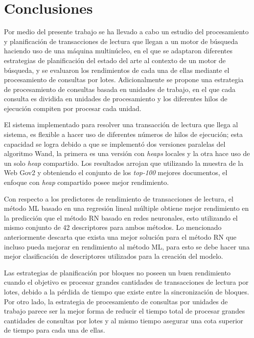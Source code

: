 \chapter{Conclusiones}
\label{cap:conclu}
Por medio del presente trabajo se ha llevado a cabo un estudio del procesamiento y planificación de transacciones de lectura que llegan a un motor de búsqueda haciendo uso de una máquina multinúcleo, en el que se adaptaron diferentes estrategias de planificación del estado del arte al contexto de un motor de búsqueda, y se evaluaron los rendimientos de cada una de ellas mediante el procesamiento de consultas por lotes. Adicionalmente se propone una estrategia de procesamiento de consultas basada en unidades de trabajo, en el que cada consulta es dividida en unidades de procesamiento y los diferentes hilos de ejecución compiten por procesar cada unidad.

El sistema implementado para resolver una transacción de lectura que llega al sistema, es flexible a hacer uso de diferentes números de hilos de ejecución; esta capacidad se logra debido a que se implementó dos versiones paralelas del algoritmo Wand, la primera es una versión con \textit{heaps} locales y la otra hace uso de un solo \textit{heap} compartido. Los resultados arrojan que utilizando la muestra de la Web Gov2 y obteniendo el conjunto de los \textit{top-100} mejores documentos, el enfoque con \textit{heap} compartido posee mejor rendimiento. 

Con respecto a los predictores de rendimiento de transacciones de lectura, el método ML basado en una regresión lineal múltiple obtiene mejor rendimiento en la predicción que el método RN basado en redes neuronales, esto utilizando el mismo conjunto de 42 descriptores para ambos métodos. Lo mencionado anteriormente descarta que exista una mejor solución para el método RN que incluso pueda mejorar en rendimiento al método ML, para esto se debe hacer una mejor clasificación de descriptores utilizados para la creación del modelo.
 
Las estrategias de planificación por bloques no poseen un buen rendimiento cuando el objetivo es procesar grandes cantidades de transacciones de lectura por lotes, debido a la pérdida de tiempo que existe entre la sincronización de bloques. Por otro lado, la estrategia de procesamiento de consultas por unidades de trabajo parece ser la mejor forma de reducir el tiempo total de procesar grandes cantidades de consultas por lotes y al mismo tiempo asegurar una cota superior de tiempo para cada una de ellas.

